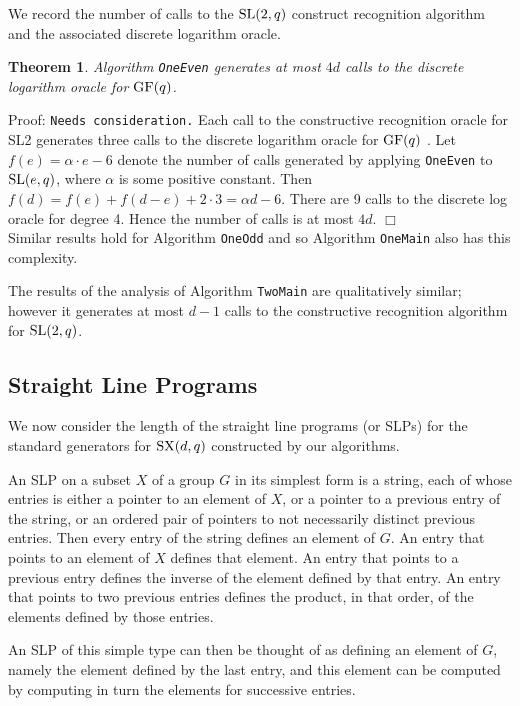 \documentclass[12pt]{article}
\newtheorem{theorem}[definition]{Theorem}
\newenvironment{proof}{\normalsize {\sc Proof}:}{{\hfill $\Box$ \\}}
\def\SL{{\rm SL}}
\def\GF{{\rm GF}}
\def\SX{{\rm SX}}
\begin{document}
We record the number of calls to the $\SL(2, q)$ construct
recognition algorithm and the associated discrete logarithm oracle.
\begin{theorem}\label{Theorem2} 
Algorithm {\tt OneEven} generates at most $4d$ calls to 
the discrete logarithm oracle for $\GF(q)$.
\end{theorem}
\begin{proof}
{\tt Needs consideration.} 
Each call to the constructive recognition oracle for SL2 generates 
three calls to the discrete logarithm oracle for $\GF(q)$ \cite{Conderetal05}.
Let $f(e) =  \alpha\cdot e - 6$ denote the number
of calls generated by applying {\tt OneEven} to $\SL(e, q)$, 
where $\alpha$ is some positive constant.  
Then $f(d) = f(e) + f(d - e) + 2 \cdot 3 = \alpha d - 6$.
There are 9 calls to the discrete log oracle for degree 4.
Hence the number of calls is at most $4d$.
\end{proof}
Similar results hold for Algorithm {\tt OneOdd} and so 
Algorithm {\tt OneMain} also has this complexity.

The results of the analysis of Algorithm {\tt TwoMain} are 
qualitatively similar; however it generates at most $d-1$ calls to the 
constructive recognition algorithm for $\SL(2,q)$.  

\subsection{Straight Line Programs}\label{SLP}

We now consider the length of the straight line programs (or SLPs) for
the standard generators for $\SX(d, q)$ constructed by our algorithms.

An SLP on a subset $X$ of a group $G$ in its simplest form is a
string, each of whose entries is either a pointer to an element of $X$, or a pointer to a previous
entry of the string, or an ordered pair of pointers to not necessarily distinct previous entries.
Then every entry of the string defines an element of $G$.  An entry that points to an element of
$X$ defines that element.  An entry that points to a previous entry defines the inverse of the
element defined by that entry.  An entry that points to two previous entries defines the
product, in that order, of the elements defined by those entries.

An SLP of this simple type can then be thought of as defining an element of $G$,
namely the element defined by the last entry, and this element can be computed by computing in turn
the elements for successive entries.
\end{document}
